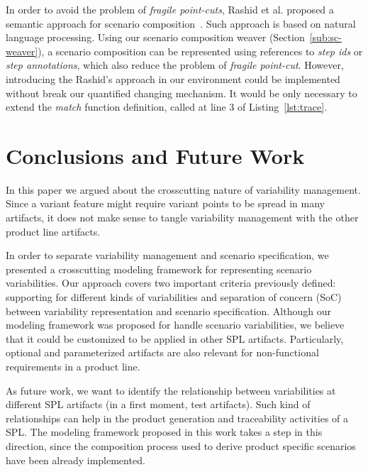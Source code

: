 \documentclass{acm_proc_article-sp}
\begin{document}
In order to avoid the problem of \emph{fragile point-cuts}, Rashid
et al. proposed a semantic approach for scenario
composition~\cite{rashid-aosd-2007}. Such approach is based on
natural language processing. Using our scenario composition weaver
(Section~\ref{sub:sc-weaver}), a scenario composition can be
represented using references to \emph{step ids} or \emph{step annotations}, 
which also reduce the problem of \emph{fragile point-cut}. However,
introducing the Rashid's approach in our environment could be
implemented without break our quantified changing mechanism. It
would be only necessary to extend the \emph{match} function
definition, called at line 3 of Listing~\ref{lst:trace}.

\section{Conclusions and Future Work}\label{sec:conclusions}

In this paper we argued about the crosscutting nature of 
variability management. Since a variant feature might require
variant points to be spread in many artifacts, it does not make sense 
to tangle variability management with the other product line artifacts. 

In order to separate variability management and scenario specification, 
we presented a crosscutting modeling framework for representing
scenario variabilities. Our approach covers two important criteria previously
defined: supporting for different kinds of variabilities and separation
of concern (SoC) between variability representation and scenario
specification. Although our modeling framework was proposed for handle 
scenario variabilities, we believe that it could be customized to be applied in 
other SPL artifacts. Particularly, optional and parameterized artifacts 
are also relevant for non-functional requirements in a product line.

As future work, we want to identify the relationship between
variabilities at different SPL artifacts (in a first moment, test
artifacts). Such kind of relationships can help in the product
generation and traceability activities of a SPL. The modeling
framework proposed in this work takes a step in this direction, since the 
composition process used to derive product specific scenarios have been already 
implemented.

%
%



\end{document}
